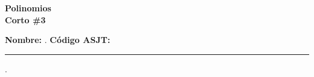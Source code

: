 \begin{center} \textbf
{
    \Large Polinomios \\ \vspace{2mm}Corto \#3
}
\end{center}

\vspace{8mm}

\textbf{Nombre:} \hrulefill.
\textbf{Código ASJT:} \rule{4cm}{0.1mm}.

\thispagestyle{first-page-style}